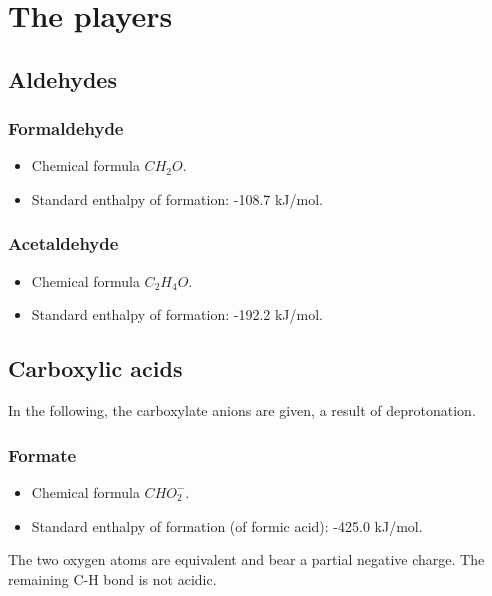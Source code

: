 \documentclass{article}
\begin{document}

\pagebreak
\section{The players}\label{sec_players}

\subsection{Aldehydes}

\subsubsection{Formaldehyde}

\begin{itemize}
    \item Chemical formula $CH_2O$.
    \item Standard enthalpy of formation: -108.7 kJ/mol.
\end{itemize}

\subsubsection{Acetaldehyde}

\begin{itemize}
    \item Chemical formula $C_2H_4O$.
    \item Standard enthalpy of formation: -192.2 kJ/mol.
\end{itemize}

\subsection{Carboxylic acids}

In the following, the carboxylate anions are given, a result of deprotonation.

\subsubsection{Formate}
\begin{itemize}
    \item Chemical formula $CHO_2^-$.
    \item Standard enthalpy of formation (of formic acid): -425.0 kJ/mol.
\end{itemize}
The two oxygen atoms are equivalent and bear a partial negative charge. The remaining C-H
bond is not acidic.
\end{document}
